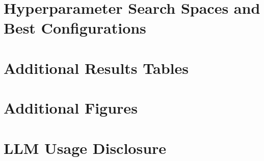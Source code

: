 
\section{Hyperparameter Search Spaces and Best Configurations}
\label{sec:app-hyperparams}

\section{Additional Results Tables}
\label{sec:app-results}

\section{Additional Figures}
\label{sec:app-figures}

\section{LLM Usage Disclosure}
\label{sec:app-llm}
